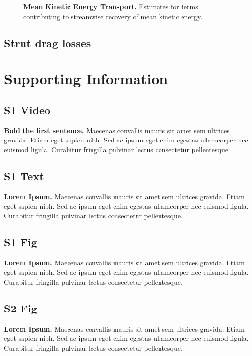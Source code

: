 \documentclass[10pt,letterpaper]{article}
\begin{document}
\begin{figure}[ht!]
\caption{{\bf Mean Kinetic Energy Transport.}
Estimates for terms contributing to streamwise recovery of mean kinetic energy.}
\label{fig:Ktransport}
\end{figure}


\subsection*{Strut drag losses}



\section*{Supporting Information}

\subsection*{S1 Video}
\label{S1_Video}
{\bf Bold the first sentence.}  Maecenas convallis mauris sit amet sem ultrices
gravida. Etiam eget sapien nibh. Sed ac ipsum eget enim egestas ullamcorper nec
euismod ligula. Curabitur fringilla pulvinar lectus consectetur pellentesque.

\subsection*{S1 Text}
\label{S1_Text}
{\bf Lorem Ipsum.} Maecenas convallis mauris sit amet sem ultrices gravida.
Etiam eget sapien nibh. Sed ac ipsum eget enim egestas ullamcorper nec euismod
ligula. Curabitur fringilla pulvinar lectus consectetur pellentesque.

\subsection*{S1 Fig}
\label{S1_Fig}
{\bf Lorem Ipsum.} Maecenas convallis mauris sit amet sem ultrices gravida.
Etiam eget sapien nibh. Sed ac ipsum eget enim egestas ullamcorper nec euismod
ligula. Curabitur fringilla pulvinar lectus consectetur pellentesque.

\subsection*{S2 Fig}
\label{S2_Fig}
{\bf Lorem Ipsum.} Maecenas convallis mauris sit amet sem ultrices gravida.
Etiam eget sapien nibh. Sed ac ipsum eget enim egestas ullamcorper nec euismod
ligula. Curabitur fringilla pulvinar lectus consectetur pellentesque.
\end{document}
